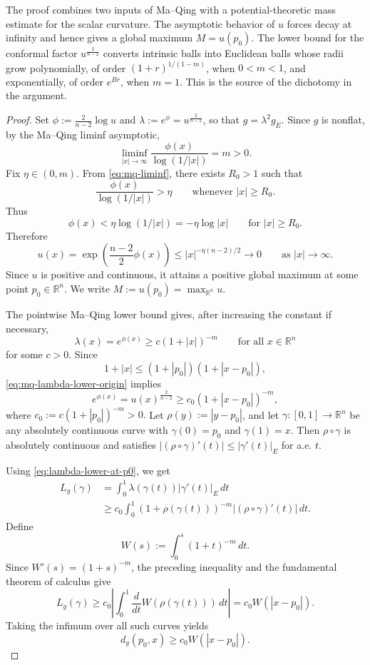 \documentclass[12pt,oneside,a4paper]{article}
\theoremstyle{mytheorem}
\theoremstyle{remark}
\begin{document}
The proof combines two inputs of Ma--Qing with a potential-theoretic mass
estimate for the scalar curvature. The asymptotic behavior of $u$ forces decay
at infinity and hence gives a global maximum $M=u(p_0)$. The lower bound for
the conformal factor $u^{\frac{2}{n-2}}$ converts intrinsic balls into Euclidean
balls whose radii grow polynomially, of order $(1+r)^{1/(1-m)}$, when
$0<m<1$, and exponentially, of order $e^{Br}$, when $m=1$. This is the source of the dichotomy in the argument.




\begin{proof}
Set $\phi:=\frac{2}{n-2}\log u$ and $\lambda:=e^\phi=u^{\frac{2}{n-2}}$, so that
$g=\lambda^2 g_E$. Since $g$ is nonflat, by the Ma--Qing liminf asymptotic,
\begin{equation}\label{eq:mq-liminf}
\liminf_{|x|\to\infty}\frac{\phi(x)}{\log(1/|x|)}=m>0.
\end{equation}
Fix $\eta\in(0,m)$.  From \eqref{eq:mq-liminf}, there exists $R_0>1$ such that
\[
\frac{\phi(x)}{\log(1/|x|)}>\eta
\qquad\text{whenever } |x|\ge R_0.
\]
  Thus
\[
\phi(x)<\eta\log(1/|x|)=-\eta\log |x|
\qquad\text{for } |x|\ge R_0.
\]
Therefore
\[
u(x)=\exp\!\left(\frac{n-2}{2}\phi(x)\right)
\le |x|^{-\eta(n-2)/2}\longrightarrow0
\qquad\text{as } |x|\to\infty.
\]
Since $u$ is positive and continuous, it attains a positive global maximum at
some point $p_0\in\mathbb{R}^n$.  We write $M:=u(p_0)=\max_{\mathbb{R}^n}u.$


The pointwise Ma--Qing lower bound \cite[(1.11)]{zbMATH07420360}  gives, after increasing the constant if
necessary,
\begin{equation}\label{eq:mq-lambda-lower-origin}
\lambda(x)=e^{\phi(x)}\ge c(1+|x|)^{-m}
\qquad\text{for all }x\in\mathbb{R}^n
\end{equation}
for some $c>0$.  Since
\[
1+|x|\le (1+|p_0|)(1+|x-p_0|),
\]
\eqref{eq:mq-lambda-lower-origin} implies 
\begin{equation}\label{eq:lambda-lower-at-p0}
 e^{\phi(x)}=u(x)^{\frac{2}{n-2}}
 \ge c_0(1+|x-p_0|)^{-m},
\end{equation} 
where  $c_0:=c(1+|p_0|)^{-m}>0.$  Let $\rho(y):=|y-p_0|$, and let $\gamma:[0,1]\to\mathbb{R}^n$ be any absolutely
continuous curve with $\gamma(0)=p_0$ and $\gamma(1)=x$.  Then $\rho\circ\gamma$
is absolutely continuous and satisfies
$| (\rho\circ\gamma)'(t)|\le |\gamma'(t)|_E$ for a.e. $t.$

Using \eqref{eq:lambda-lower-at-p0}, we get
\[
\begin{aligned}
L_g(\gamma)
&=\int_0^1\lambda(\gamma(t))|\gamma'(t)|_E\,d t \\
&\ge c_0\int_0^1(1+\rho(\gamma(t)))^{-m}|(\rho\circ\gamma)'(t)|\,d t.
\end{aligned}
\]
Define
\[
W(s):=\int_0^s(1+t)^{-m}\,d t.
\]
Since $W'(s)=(1+s)^{-m}$, the preceding inequality and the fundamental theorem
of calculus give
\[
L_g(\gamma)
\ge c_0\left|\int_0^1 \frac{d}{dt}W(\rho(\gamma(t)))\,d t\right|
= c_0 W(|x-p_0|).
\]
Taking the infimum over all such curves yields
\begin{equation}\label{eq:distance-lower-W}
d_g(p_0,x)\ge c_0W(|x-p_0|).
\end{equation}


\end{proof}
\end{document}
